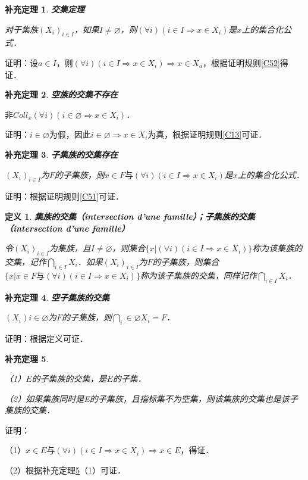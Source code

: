 \documentclass[12pt, a4paper, oneside]{book}
\newtheorem{cor}{补充定理}
\newtheorem{de}{定义}
\begin{document}
			\begin{cor}\label{cor92}
				\textbf{交集定理}
				\par
				对于集族$(X_i)_{i\in I}$，如果$I\neq \varnothing$，则$(\forall i)(i\in I\Rightarrow x\in X_i)$是$x$上的集合化公式．
			\end{cor}
			证明：设$a\in I$，则$(\forall i)(i\in I\Rightarrow x\in X_i) \Rightarrow x\in X_a$，根据证明规则\ref{C52}得证．
						
			\begin{cor}\label{cor93}
				\textbf{空族的交集不存在}
				\par
				$\text{非}Coll_x(\forall i)(i\in \varnothing\Rightarrow x\in X_i)$．
			\end{cor}
			证明：$i\in \varnothing$为假，因此$i\in \varnothing\Rightarrow x\in X_i$为真，根据证明规则\ref{C13}可证．
			
			\begin{cor}\label{cor94}
				\textbf{子集族的交集存在}
				\par
				$(X_i)_{i\in I}$为$F$的子集族，则$x\in F\text{与}(\forall i)(i\in I\Rightarrow x\in X_i)$是$x$上的集合化公式．
			\end{cor}
			证明：根据证明规则\ref{C51}可证．

			\begin{de}
				\textbf{集族的交集（intersection d'une famille）；子集族的交集（intersection d'une famille）}
				\hfill\par
				令$(X_i)_{i\in I}$为集族，且$I\neq \varnothing$，则集合$\{x|(\forall i)(i\in I\Rightarrow x\in X_i)\}$称为该集族的交集，记作$\bigcap\limits_{i\in I}X_i$．如果$(X_i)_{i\in I}$为$F$的子集族，则集合$\{x|x\in F\text{与}(\forall i)(i\in I\Rightarrow x\in X_i)\}$称为该子集族的交集，同样记作$\bigcap\limits_{i\in I}X_i$．
			\end{de}
			
			\begin{cor}\label{cor95}
				\textbf{空子集族的交集}
				\par
				$(X_i)i\in \varnothing$为$F$的子集族，则$\bigcap\limits_i\in \varnothing X_i=F$．
			\end{cor}
			证明：根据定义可证．
			
			\begin{cor}\label{cor96}
				\hfill\par
				（1）$E$的子集族的交集，是$E$的子集．
				\par
				（2）如果集族同时是E的子集族，且指标集不为空集，则该集族的交集也是该子集族的交集．
			\end{cor}
			证明：
			\par
			（1）$x\in E\text{与}(\forall i)(i\in I\Rightarrow x\in X_i)\Rightarrow x\in E$，得证．
			\par
			（2）根据补充定理\ref{cor96}（1）可证．
\end{document}
